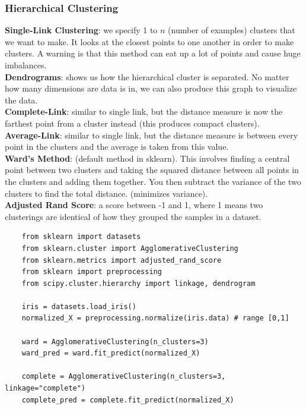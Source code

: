 \documentclass[11pt, a4paper]{article}
\begin{document}
\begin{spacing}{1.1}
	\subsubsection{Hierarchical Clustering}
	\textbf{Single-Link Clustering}: we specify 1 to $n$ (number of examples) clusters that we want to make. It looks at the closest points to one another in order to make clusters. A warning is that this method can eat up a lot of points and cause huge imbalances. \vspace*{2mm}\\
	\textbf{Dendrograms}: shows us how the hierarchical cluster is separated. No matter how many dimensions are data is in, we can also produce this graph to visualize the data. \vspace*{2mm}\\
	\textbf{Complete-Link}: similar to single link, but the distance measure is now the farthest point from a cluster instead (this produces compact clusters). \vspace*{2mm}\\
	\textbf{Average-Link}: similar to single link, but the distance measure is between every point in the clusters and the average is taken from this value. \vspace*{2mm}\\
	\textbf{Ward's Method}: (default method in sklearn). This involves finding a central point between two clusters and taking the squared distance between all points in the clusters and adding them together. You then subtract the variance of the two clusters to find the total distance. (minimizes variance). \vspace*{2mm}\\
	\textbf{Adjusted Rand Score}: a score between -1 and 1, where 1 means two clusterings are identical of how they grouped the samples in a dataset. \newpage

	\begin{lstlisting}
	from sklearn import datasets
	from sklearn.cluster import AgglomerativeClustering
	from sklearn.metrics import adjusted_rand_score 
	from sklearn import preprocessing
	from scipy.cluster.hierarchy import linkage, dendrogram
	
	iris = datasets.load_iris()
	normalized_X = preprocessing.normalize(iris.data) # range [0,1]
	
	ward = AgglomerativeClustering(n_clusters=3)
	ward_pred = ward.fit_predict(normalized_X)
	
	complete = AgglomerativeClustering(n_clusters=3, linkage="complete")
	complete_pred = complete.fit_predict(normalized_X)
	

\end{lstlisting}
\end{spacing}
\end{document}
